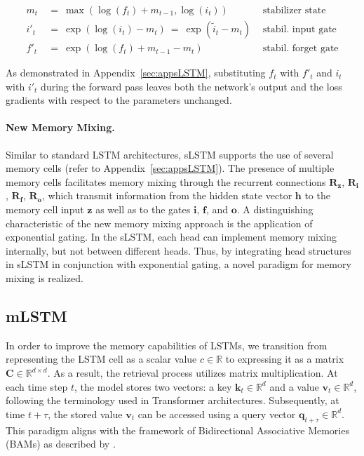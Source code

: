 \begin{align}
\label{eq:slstmstabil}
m_t \ &= \ \max \left( \log ( f_t ) + m_{t-1} , \log ( i_t ) \right) &\text{stabilizer state} \\
i'_t \ &= \ \!\exp \left( \log \left ( i_t \right) - m_t \right) \ = \ \!\exp \left( \tilde{i}_t - m_t \right) \ \, 
  &\text{stabil. input gate} \\
f'_t \ &= \ \!\exp \left( \log \left( f_t \right) + m_{t-1} - m_t \right) \ \, 
  &\text{stabil. forget gate}
\end{align}

As demonstrated in Appendix~\ref{sec:appsLSTM}, substituting $f_t$ with $f'_t$ and $i_t$ with $i'_t$ during the forward pass leaves both the network's output and the loss gradients with respect to the parameters unchanged.

\paragraph{New Memory Mixing.} Similar to standard LSTM architectures, sLSTM supports the use of several memory cells (refer to Appendix~\ref{sec:appsLSTM}). The presence of multiple memory cells facilitates memory mixing through the recurrent connections $\mathbf{R}_{\mathbf{z}}$, $\mathbf{R}_{\mathbf{i}}$, $\mathbf{R}_{\mathbf{f}}$, $\mathbf{R}_{\mathbf{o}}$, which transmit information from the hidden state vector $\mathbf{h}$ to the memory cell input $\mathbf{z}$ as well as to the gates $\mathbf{i}$, $\mathbf{f}$, and $\mathbf{o}$. A distinguishing characteristic of the new memory mixing approach is the application of exponential gating. In the sLSTM, each head can implement memory mixing internally, but not between different heads. Thus, by integrating head structures in sLSTM in conjunction with exponential gating, a novel paradigm for memory mixing is realized.

\subsection{mLSTM}
\label{sec:mLSTM}

In order to improve the memory capabilities of LSTMs, we transition from representing the LSTM cell as a scalar value $c \in \mathbb{R}$ to expressing it as a matrix $\mathbf{C} \in \mathbb{R}^{d \times d}$. As a result, the retrieval process utilizes matrix multiplication. At each time step $t$, the model stores two vectors: a key $\mathbf{k}_t \in \mathbb{R}^d$ and a value $\mathbf{v}_t \in \mathbb{R}^d$, following the terminology used in Transformer architectures. Subsequently, at time $t + \tau$, the stored value $\mathbf{v}_t$ can be accessed using a query vector $\mathbf{q}_{t+\tau} \in \mathbb{R}^d$. This paradigm aligns with the framework of Bidirectional Associative Memories (BAMs) as described by \citep{Kohonen:72,Anderson:72,Nakano:72,Anderson:77}.

